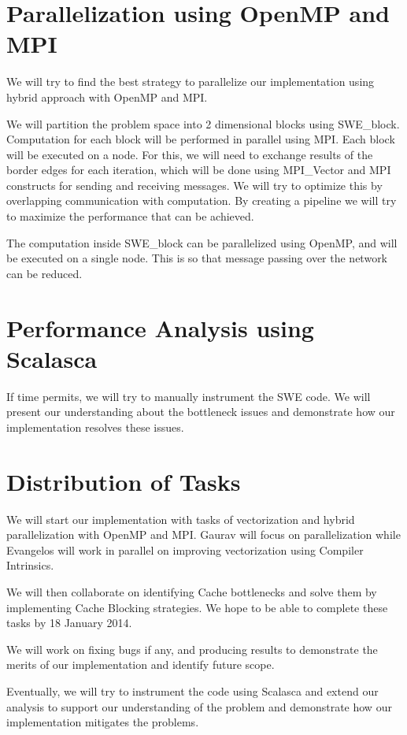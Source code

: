 \documentclass[]{article}
\begin{document}
\section{Parallelization using OpenMP and MPI}
We will try to find the best strategy to parallelize our implementation using hybrid
approach with OpenMP and MPI. 

We will partition the problem space into 2 dimensional blocks using SWE\_block. Computation
for each block will be performed in parallel using MPI. Each block will be executed on a node.
For this, we will need to exchange results of the border edges for each iteration, which will
be done using MPI\_Vector and MPI constructs for sending and receiving messages. We will try
to optimize this by overlapping communication with computation.
By creating a pipeline we will try to maximize the performance that can be achieved.

The computation inside SWE\_block can be parallelized
using OpenMP, and will be executed on a single node. This is so that message passing
over the network can be reduced.

\section{Performance Analysis using Scalasca}
If time permits, we will try to manually instrument the SWE code. We will present our
understanding about the bottleneck issues and demonstrate how our implementation
resolves these issues.

\section{Distribution of Tasks}
We will start our implementation with tasks of vectorization and hybrid parallelization
with OpenMP and MPI. Gaurav will focus on parallelization while Evangelos will work in parallel
on improving vectorization using Compiler Intrinsics. 

We will then collaborate on identifying Cache bottlenecks and solve them by implementing
Cache Blocking strategies. We hope to be able to complete these tasks by 18 January 2014.

We will work on fixing bugs if any, and producing results to demonstrate the merits of our
implementation and identify future scope.

Eventually, we will try to instrument the code using Scalasca and extend our analysis to support
our understanding of the problem and demonstrate how our implementation mitigates the problems.
\end{document}
